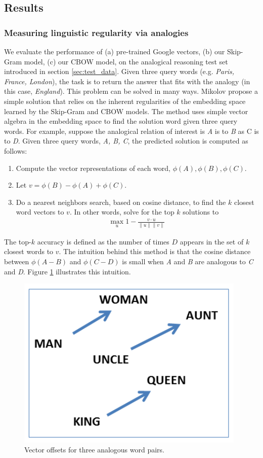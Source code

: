 \subsection{Results}\label{sec:results}

\subsubsection{Measuring linguistic regularity via analogies}\label{results:analogy}
We evaluate the performance of (a) pre-trained Google vectors, (b) our Skip-Gram model, (c) our CBOW model, on the analogical reasoning test set introduced in section \ref{sec:test_data}. Given three query words (e.g. {\it Paris, France, London}), the task is to return the answer that fits with the analogy (in this case, {\it England}). This problem can be solved in many ways. Mikolov \etal \cite{mikolov1} propose a simple solution that relies on the inherent regularities of the embedding space learned by the Skip-Gram and CBOW models. The method uses simple vector algebra in the embedding space to find the solution word given three query words. For example, suppose the analogical relation of interest is {\it A} is to {\it B} as {\it} C is to {\it D}. Given three query words, {\it A, B, C}, the predicted solution is computed as follows:
\begin{enumerate}
\item Compute the vector representations of each word, $\phi(A), \phi(B), \phi(C)$.
\item Let $v = \phi(B) - \phi(A) + \phi(C)$.
\item Do a nearest neighbors search, based on cosine distance, to find the $k$ closest word vectors to $v$. In other words, solve for the top $k$ solutions to 
	\begin{align} \max_u 1 - \frac{ v \cdot u}{\| u \| \| v \|}\ \end{align}
\end{enumerate}

The top-$k$ accuracy is defined as the number of times $D$ appears in the set of $k$ closest words to $v$. The intuition behind this method is that the cosine distance between $\phi(A - B)$ and $\phi(C - D)$ is small when {\it A} and {\it B} are analogous to {\it C} and {\it D}. Figure \ref{fig:offsets} illustrates this intuition. 

\begin{figure}[h]
\centering
\includegraphics[width=.45\textwidth]{./images/king_queen.png}
\caption{Vector offsets for three analogous word pairs.}
\label{fig:offsets}
\end{figure}

